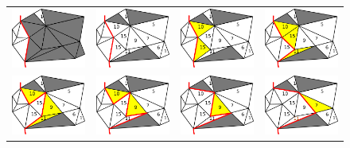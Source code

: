 \begin{figure}[tp]
\centering
 \begin{tabular}{cccc}
  \includegraphics[width=0.2\columnwidth]{./img/ch_soa/incrementalGrowing00}&
  \includegraphics[width=0.2\columnwidth]{./img/ch_soa/incrementalGrowing01}&
  \includegraphics[width=0.2\columnwidth]{./img/ch_soa/incrementalGrowing02}&
  \includegraphics[width=0.2\columnwidth]{./img/ch_soa/incrementalGrowing03}\\
  \includegraphics[width=0.2\columnwidth]{./img/ch_soa/incrementalGrowing04}&
  \includegraphics[width=0.2\columnwidth]{./img/ch_soa/incrementalGrowing05}&
  \includegraphics[width=0.2\columnwidth]{./img/ch_soa/incrementalGrowing06}&
  \includegraphics[width=0.2\columnwidth]{./img/ch_soa/incrementalGrowing07}\\

\end{tabular}
\end{figure}
